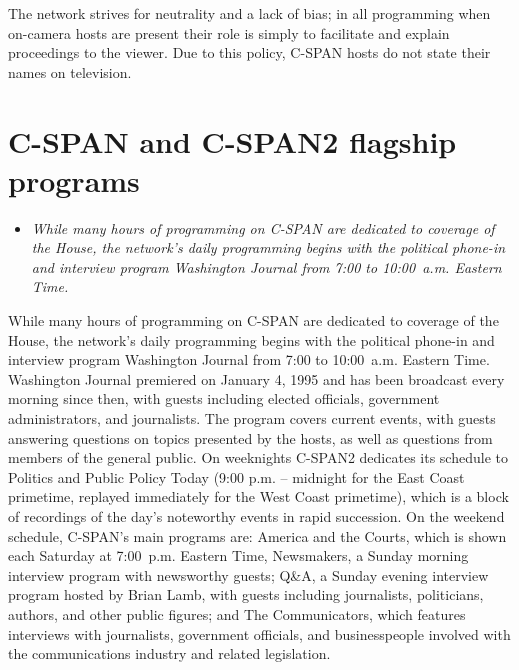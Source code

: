 The network strives for neutrality and a lack of bias; in all
programming when on-camera hosts are present their role is simply to
facilitate and explain proceedings to the viewer. Due to this policy,
C-SPAN hosts do not state their names on television.

\section{C-SPAN and C-SPAN2 flagship
programs}\label{c-span-and-c-span2-flagship-programs}

\begin{itemize}
\item
  \emph{While many hours of programming on C-SPAN are dedicated to
  coverage of the House, the network's daily programming begins with the
  political phone-in and interview program Washington Journal from 7:00
  to 10:00~a.m. Eastern Time.}
\end{itemize}

While many hours of programming on C-SPAN are dedicated to coverage of
the House, the network's daily programming begins with the political
phone-in and interview program Washington Journal from 7:00 to
10:00~a.m. Eastern Time. Washington Journal premiered on January 4, 1995
and has been broadcast every morning since then, with guests including
elected officials, government administrators, and journalists. The
program covers current events, with guests answering questions on topics
presented by the hosts, as well as questions from members of the general
public. On weeknights C-SPAN2 dedicates its schedule to Politics and
Public Policy Today (9:00 p.m. -- midnight for the East Coast primetime,
replayed immediately for the West Coast primetime), which is a block of
recordings of the day's noteworthy events in rapid succession. On the
weekend schedule, C-SPAN's main programs are: America and the Courts,
which is shown each Saturday at 7:00~p.m. Eastern Time, Newsmakers, a
Sunday morning interview program with newsworthy guests; Q\&A, a Sunday
evening interview program hosted by Brian Lamb, with guests including
journalists, politicians, authors, and other public figures; and The
Communicators, which features interviews with journalists, government
officials, and businesspeople involved with the communications industry
and related legislation.

